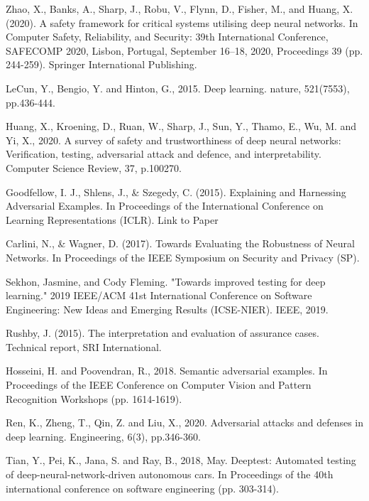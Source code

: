 \label{chp:5}
\begin{singlespace}
\begin{thebibliography}{}


Zhao, X., Banks, A., Sharp, J., Robu, V., Flynn, D., Fisher, M., and Huang, X. (2020). A safety framework for critical systems utilising deep neural networks. In Computer Safety, Reliability, and Security: 39th International Conference, SAFECOMP 2020, Lisbon, Portugal, September 16–18, 2020, Proceedings 39 (pp. 244-259). Springer International Publishing.


LeCun, Y., Bengio, Y. and Hinton, G., 2015. Deep learning. nature, 521(7553), pp.436-444.

Huang, X., Kroening, D., Ruan, W., Sharp, J., Sun, Y., Thamo, E., Wu, M. and Yi, X., 2020. A survey of safety and trustworthiness of deep neural networks: Verification, testing, adversarial attack and defence, and interpretability. Computer Science Review, 37, p.100270.


 Goodfellow, I. J., Shlens, J., \& Szegedy, C. (2015). Explaining and Harnessing Adversarial Examples. In Proceedings of the International Conference on Learning Representations (ICLR). Link to Paper

 Carlini, N., \& Wagner, D. (2017). Towards Evaluating the Robustness of Neural Networks. In Proceedings of the IEEE Symposium on Security and Privacy (SP).
   
 Sekhon, Jasmine, and Cody Fleming. "Towards improved testing for deep learning." 2019 IEEE/ACM 41st International Conference on Software Engineering: New Ideas and Emerging Results (ICSE-NIER). IEEE, 2019.

Rushby, J. (2015). The interpretation and evaluation of assurance cases. Technical report, SRI International.

Hosseini, H. and Poovendran, R., 2018. Semantic adversarial examples. In Proceedings of the IEEE Conference on Computer Vision and Pattern Recognition Workshops (pp. 1614-1619).

Ren, K., Zheng, T., Qin, Z. and Liu, X., 2020. Adversarial attacks and defenses in deep learning. Engineering, 6(3), pp.346-360.

Tian, Y., Pei, K., Jana, S. and Ray, B., 2018, May. Deeptest: Automated testing of deep-neural-network-driven autonomous cars. In Proceedings of the 40th international conference on software engineering (pp. 303-314).






\end{thebibliography}
\end{singlespace}
